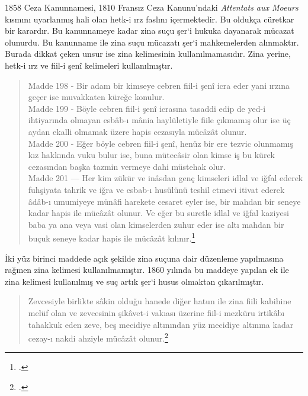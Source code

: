 1858 Ceza Kanunnamesi, 1810 Fransız Ceza Kanunu'ndaki \textit{Attentats aux Moeurs} kısmını uyarlanmış hali olan hetk-i ırz faslını içermektedir. Bu oldukça cüretkar bir karardır. Bu kanunnameye kadar zina suçu şer`i hukuka dayanarak mücazat olunurdu. Bu kanunname ile zina suçu mücazatı şer`i mahkemelerden alınmaktır. Burada dikkat çeken unsur ise zina kelimesinin kullanılmamasıdır. 
Zina yerine, hetk-i ırz ve fiil-i şenî kelimeleri kullanılmıştır. 
\begin{quote}
    Madde 198 - Bir adam bir kimseye cebren fiil-i şenî icra eder yani ırzına geçer ise muvakkaten küreğe konulur.\\
    Madde 199 - Böyle cebren fiil-i şenî icrasına tasaddi edip de yed-i ihtiyarında olmayan esbâb-ı mânia haylületiyle fiile çıkmamış olur ise üç aydan ekalli olmamak üzere hapis cezasıyla mücâzât olunur.\\
    Madde 200 - Eğer böyle cebren fiil-i şenî, henüz bir ere tezvic olunmamış kız hakkında vuku bulur ise, buna mütecâsir olan kimse iş bu kürek cezasından başka tazmin vermeye dahi müstehak olur.\\
    Madde 201 — Her kim zükür ve inâsdan genç kimseleri idlal ve iğfal ederek fuhşiyata tahrik ve iğra ve esbab-ı husülünü teshil etmevi itivat ederek âdâb-ı umumiyeye münâfi harekete cesaret eyler ise, bir mahdan bir seneye kadar hapis ile mücâzât olunur. Ve eğer bu suretle idlal ve iğfal kaziyesi baba ya ana veya vasi olan kimselerden zuhur eder ise altı mahdan bir buçuk seneye kadar hapis ile mücâzât kılınır.\footcite[865]{islam_osmanli_hukuku}
\end{quote}
İki yüz birinci maddede açık şekilde zina suçuna dair düzenleme yapılmasına rağmen zina kelimesi kullanılmamıştır. 1860 yılında bu maddeye yapılan ek ile zina kelimesi kullanılmış ve suç artık şer`i husus olmaktan çıkarılmıştır.
\begin{quote}
Zevcesiyle birlikte sâkin olduğu hanede diğer hatun ile zina fiili kabihine melüf olan ve zevcesinin şikâvet-i vakıası üzerine fiil-i mezküru irtikâbı tahakkuk eden zevc, beş mecidiye altınından yüz mecidiye altınına kadar cezay-ı nakdi ahziyle mücâzât olunur.\footcite[866]{islam_osmanli_hukuku}
\end{quote}

